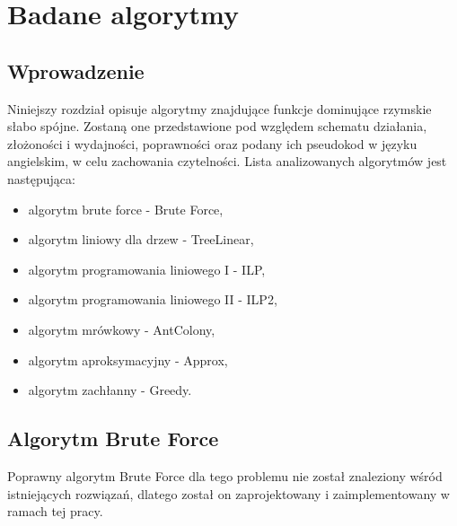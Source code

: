 \chapter{Badane algorytmy}

\section{Wprowadzenie}
Niniejszy rozdział opisuje algorytmy znajdujące funkcje dominujące rzymskie słabo spójne. Zostaną one przedstawione pod względem schematu działania, złożoności i wydajności, poprawności oraz podany ich pseudokod w języku angielskim, w celu zachowania czytelności. Lista analizowanych algorytmów jest następująca:

\begin{itemize}
    \item algorytm brute force - Brute Force,
    \item algorytm liniowy dla drzew - TreeLinear,
    \item algorytm programowania liniowego I - ILP,
    \item algorytm programowania liniowego II - ILP2,
    \item algorytm mrówkowy - AntColony,
    \item algorytm aproksymacyjny - Approx,
    \item algorytm zachłanny - Greedy.
\end{itemize}

\section{Algorytm Brute Force}

   Poprawny algorytm Brute Force dla tego problemu nie został znaleziony wśród istniejących rozwiązań, dlatego został on zaprojektowany i zaimplementowany w ramach tej pracy.

